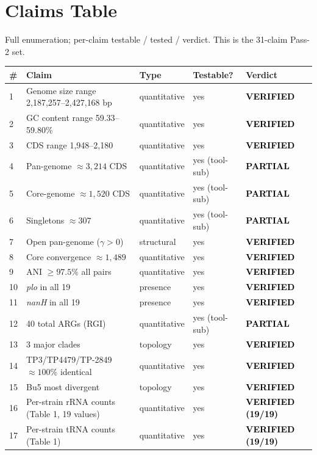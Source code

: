 \documentclass[11pt,a4paper]{article}
\newcommand{\verdict}[1]{\textbf{\textcolor{black}{#1}}}
\begin{document}
\section{Claims Table}
Full enumeration; per-claim testable / tested / verdict. This is the 31-claim Pass-2 set.

\begin{longtable}{@{}p{0.5cm}p{7.3cm}p{2.5cm}p{2.3cm}p{2.5cm}@{}}
\toprule
\# & Claim & Type & Testable? & Verdict \\
\midrule
\endhead
1 & Genome size range 2{,}187{,}257--2{,}427{,}168 bp & quantitative & yes & \verdict{VERIFIED} \\
2 & GC content range 59.33--59.80\% & quantitative & yes & \verdict{VERIFIED} \\
3 & CDS range 1{,}948--2{,}180 & quantitative & yes & \verdict{VERIFIED} \\
4 & Pan-genome $\approx 3{,}214$ CDS & quantitative & yes (tool-sub) & \verdict{PARTIAL} \\
5 & Core-genome $\approx 1{,}520$ CDS & quantitative & yes (tool-sub) & \verdict{PARTIAL} \\
6 & Singletons $\approx 307$ & quantitative & yes (tool-sub) & \verdict{PARTIAL} \\
7 & Open pan-genome ($\gamma > 0$) & structural & yes & \verdict{VERIFIED} \\
8 & Core convergence $\approx 1{,}489$ & quantitative & yes & \verdict{VERIFIED} \\
9 & ANI $\geq 97.5\%$ all pairs & quantitative & yes & \verdict{VERIFIED} \\
10 & \emph{plo} in all 19 & presence & yes & \verdict{VERIFIED} \\
11 & \emph{nanH} in all 19 & presence & yes & \verdict{VERIFIED} \\
12 & 40 total ARGs (RGI) & quantitative & yes (tool-sub) & \verdict{PARTIAL} \\
13 & 3 major clades & topology & yes & \verdict{VERIFIED} \\
14 & TP3/TP4479/TP-2849 $\approx 100\%$ identical & quantitative & yes & \verdict{VERIFIED} \\
15 & Bu5 most divergent & topology & yes & \verdict{VERIFIED} \\
16 & Per-strain rRNA counts (Table 1, 19 values) & quantitative & yes & \verdict{VERIFIED (19/19)} \\
17 & Per-strain tRNA counts (Table 1) & quantitative & yes & \verdict{VERIFIED (19/19)} \\

\end{longtable}
\end{document}
